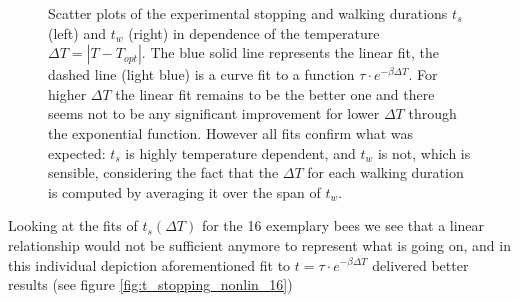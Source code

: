 \begin{figure}%
    \centering
    \caption{Scatter plots of the experimental stopping and walking durations $t_{s}$ (left) and $t_{w}$ (right) in dependence of the temperature $\Delta T = |T - T_{opt}|$. The blue solid line represents the linear fit, the dashed line (light blue) is a curve fit to a function $\tau \cdot e^{-\beta \Delta T}$. For higher $\Delta T$ the linear fit remains to be the better one and there seems not to be any significant improvement for lower $\Delta T$ through the exponential function. However all fits confirm what was expected: $t_{s}$ is highly temperature dependent, and $t_{w}$ is not, which is sensible, considering the fact that the $\Delta T$ for each walking duration is computed by averaging it over the span of $t_{w}$.}
    \label{fig:ALL_stop_walk}
\end{figure}

Looking at the fits of $t_{s}(\Delta T)$ for the 16 exemplary bees we see that a linear relationship would not be sufficient anymore to represent what is going on, and in this individual depiction aforementioned fit to $t = \tau \cdot e^{-\beta \Delta T}$ delivered better results (see figure \ref{fig:t_stopping_nonlin_16}) %

